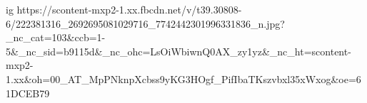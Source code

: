  
 
 
 
 

\ifcmt
  ig https://scontent-mxp2-1.xx.fbcdn.net/v/t39.30808-6/222381316_2692695081029716_7742442301996331836_n.jpg?_nc_cat=103&ccb=1-5&_nc_sid=b9115d&_nc_ohc=LsOiWbiwnQ0AX_zy1yz&_nc_ht=scontent-mxp2-1.xx&oh=00_AT_MpPNknpXcbss9yKG3HOgf_PifIbaTKszvbxl35xWxog&oe=61DCEB79
\fi
